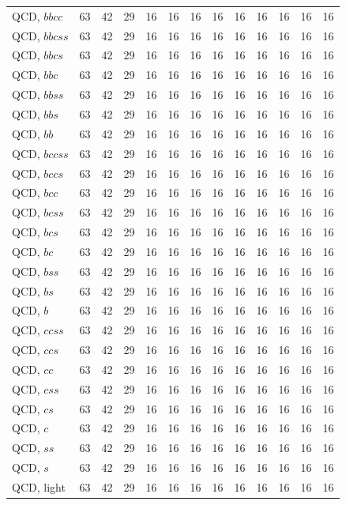 {\begin{longtable}{l rrrrrrrrrrrr}
QCD, $bbcc$ & 63 & 42 & 29 & 16 & 16 & 16 & 16 & 16 & 16 & 16 & 16 & 16 \\
QCD, $bbcss$ & 63 & 42 & 29 & 16 & 16 & 16 & 16 & 16 & 16 & 16 & 16 & 16 \\
QCD, $bbcs$ & 63 & 42 & 29 & 16 & 16 & 16 & 16 & 16 & 16 & 16 & 16 & 16 \\
QCD, $bbc$ & 63 & 42 & 29 & 16 & 16 & 16 & 16 & 16 & 16 & 16 & 16 & 16 \\
QCD, $bbss$ & 63 & 42 & 29 & 16 & 16 & 16 & 16 & 16 & 16 & 16 & 16 & 16 \\
QCD, $bbs$ & 63 & 42 & 29 & 16 & 16 & 16 & 16 & 16 & 16 & 16 & 16 & 16 \\
QCD, $bb$ & 63 & 42 & 29 & 16 & 16 & 16 & 16 & 16 & 16 & 16 & 16 & 16 \\
QCD, $bccss$ & 63 & 42 & 29 & 16 & 16 & 16 & 16 & 16 & 16 & 16 & 16 & 16 \\
QCD, $bccs$ & 63 & 42 & 29 & 16 & 16 & 16 & 16 & 16 & 16 & 16 & 16 & 16 \\
QCD, $bcc$ & 63 & 42 & 29 & 16 & 16 & 16 & 16 & 16 & 16 & 16 & 16 & 16 \\
QCD, $bcss$ & 63 & 42 & 29 & 16 & 16 & 16 & 16 & 16 & 16 & 16 & 16 & 16 \\
QCD, $bcs$ & 63 & 42 & 29 & 16 & 16 & 16 & 16 & 16 & 16 & 16 & 16 & 16 \\
QCD, $bc$ & 63 & 42 & 29 & 16 & 16 & 16 & 16 & 16 & 16 & 16 & 16 & 16 \\
QCD, $bss$ & 63 & 42 & 29 & 16 & 16 & 16 & 16 & 16 & 16 & 16 & 16 & 16 \\
QCD, $bs$ & 63 & 42 & 29 & 16 & 16 & 16 & 16 & 16 & 16 & 16 & 16 & 16 \\
QCD, $b$ & 63 & 42 & 29 & 16 & 16 & 16 & 16 & 16 & 16 & 16 & 16 & 16 \\
QCD, $ccss$ & 63 & 42 & 29 & 16 & 16 & 16 & 16 & 16 & 16 & 16 & 16 & 16 \\
QCD, $ccs$ & 63 & 42 & 29 & 16 & 16 & 16 & 16 & 16 & 16 & 16 & 16 & 16 \\
QCD, $cc$ & 63 & 42 & 29 & 16 & 16 & 16 & 16 & 16 & 16 & 16 & 16 & 16 \\
QCD, $css$ & 63 & 42 & 29 & 16 & 16 & 16 & 16 & 16 & 16 & 16 & 16 & 16 \\
QCD, $cs$ & 63 & 42 & 29 & 16 & 16 & 16 & 16 & 16 & 16 & 16 & 16 & 16 \\
QCD, $c$ & 63 & 42 & 29 & 16 & 16 & 16 & 16 & 16 & 16 & 16 & 16 & 16 \\
QCD, $ss$ & 63 & 42 & 29 & 16 & 16 & 16 & 16 & 16 & 16 & 16 & 16 & 16 \\
QCD, $s$ & 63 & 42 & 29 & 16 & 16 & 16 & 16 & 16 & 16 & 16 & 16 & 16 \\
QCD, light & 63 & 42 & 29 & 16 & 16 & 16 & 16 & 16 & 16 & 16 & 16 & 16 \\
\end{longtable}
}
